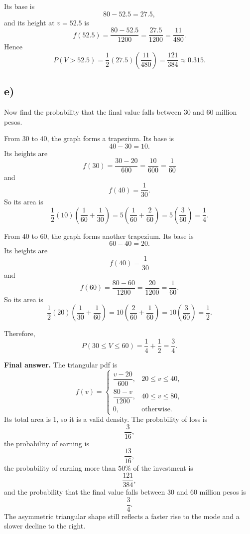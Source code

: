 Its base is
\[
80-52.5=27.5,
\]
and its height at $v=52.5$ is
\[
f(52.5)=\frac{80-52.5}{1200}=\frac{27.5}{1200}=\frac{11}{480}.
\]
Hence
\[
P(V>52.5)=\frac12(27.5)\left(\frac{11}{480}\right)=\frac{121}{384}\approx 0.315.
\]

\subsection*{e)}
Now find the probability that the final value falls between $30$ and $60$ million pesos.

From $30$ to $40$, the graph forms a trapezium. Its base is
\[
40-30=10.
\]
Its heights are
\[
f(30)=\frac{30-20}{600}=\frac{10}{600}=\frac{1}{60}
\]
and
\[
f(40)=\frac{1}{30}.
\]
So its area is
\[
\frac12(10)\left(\frac{1}{60}+\frac{1}{30}\right)
=5\left(\frac{1}{60}+\frac{2}{60}\right)
=5\left(\frac{3}{60}\right)
=\frac14.
\]

From $40$ to $60$, the graph forms another trapezium. Its base is
\[
60-40=20.
\]
Its heights are
\[
f(40)=\frac{1}{30}
\]
and
\[
f(60)=\frac{80-60}{1200}=\frac{20}{1200}=\frac{1}{60}.
\]
So its area is
\[
\frac12(20)\left(\frac{1}{30}+\frac{1}{60}\right)
=10\left(\frac{2}{60}+\frac{1}{60}\right)
=10\left(\frac{3}{60}\right)
=\frac12.
\]

Therefore,
\[
P(30\le V\le 60)=\frac14+\frac12=\frac34.
\]

\textbf{Final answer.}
The triangular pdf is
\[
f(v)=
\begin{cases}
	\dfrac{v-20}{600}, & 20\le v\le 40,\\[6pt]
	\dfrac{80-v}{1200}, & 40\le v\le 80,\\[6pt]
	0, & \text{otherwise.}
\end{cases}
\]
Its total area is $1$, so it is a valid density. The probability of loss is
\[
\frac{3}{16},
\]
the probability of earning is
\[
\frac{13}{16},
\]
the probability of earning more than $50\%$ of the investment is
\[
\frac{121}{384},
\]
and the probability that the final value falls between $30$ and $60$ million pesos is
\[
\frac{3}{4}.
\]
The asymmetric triangular shape still reflects a faster rise to the mode and a slower decline to the right.


